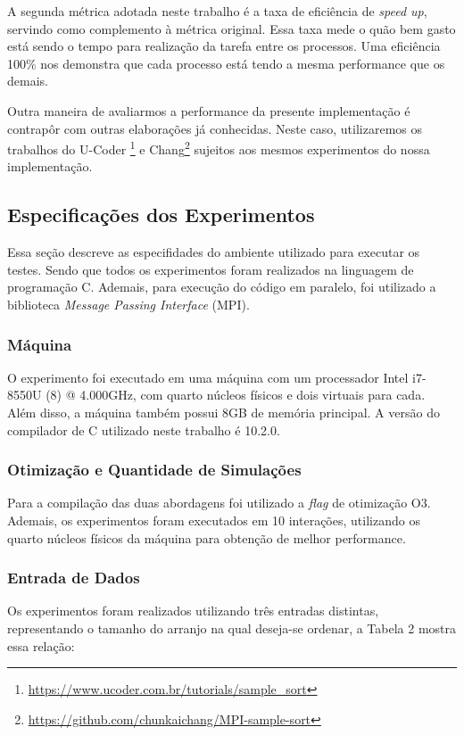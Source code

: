 \documentclass[letterpaper, 10 pt, conference]{ieeeconf}  %
\begin{document}
A segunda métrica adotada neste trabalho é a taxa de eficiência de \textit{speed up}, servindo como complemento à métrica original. Essa taxa mede o quão bem gasto está sendo o tempo para realização da tarefa entre os processos. Uma eficiência 100\% nos demonstra que cada processo está tendo a mesma performance que os demais.

Outra maneira de avaliarmos a performance da presente implementação é contrapôr com outras elaborações já conhecidas. Neste caso, utilizaremos os trabalhos do U-Coder \footnote{\url{https://www.ucoder.com.br/tutorials/sample_sort}} e Chang\footnote{\url{https://github.com/chunkaichang/MPI-sample-sort}} sujeitos aos mesmos experimentos do nossa implementação.


\subsection{Especificações dos Experimentos}

Essa seção descreve as especifidades do ambiente utilizado para executar os testes. Sendo que todos os experimentos foram realizados na linguagem de programação C. Ademais, para execução do código em paralelo, foi utilizado a biblioteca \textit{Message Passing Interface} (MPI).

\subsubsection{Máquina}
O experimento foi executado em uma máquina com um processador Intel i7-8550U (8) @ 4.000GHz, com quarto núcleos físicos e dois virtuais para cada. Além disso, a máquina também possui 8GB de memória principal. A versão do compilador de C utilizado neste trabalho é 10.2.0.
\subsubsection{Otimização e Quantidade de Simulações}
Para a compilação das duas abordagens foi utilizado a \textit{flag} de otimização O3. Ademais, os experimentos foram executados em 10 interações, utilizando os quarto núcleos físicos da máquina para obtenção de melhor performance.

\subsubsection{Entrada de Dados}
Os experimentos foram realizados utilizando três entradas distintas, representando o tamanho do arranjo na qual deseja-se ordenar, a Tabela 2 mostra essa relação:
\end{document}
